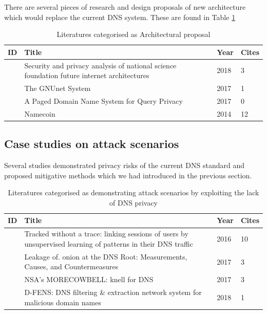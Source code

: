 \documentclass[a4paper,12pt]{article}
\begin{document}
There are several pieces of research and design proposals of new architecture which would replace the current DNS system. These are found in Table \ref{architectures}

\begin{table}[h!]
    \begin{tabular}{ | l | p{10.5cm} | l | l | }
        \hline
            ID & Title & Year & Cites \\ \hline
            \cite{ambrosin2018security} & Security and privacy analysis of national science foundation future internet architectures & 2018 & 3 \\ \hline
            \cite{grothoff2017gnunet} & The GNUnet System & 2017 & 1 \\ \hline
            \cite{asoni2017paged} & A Paged Domain Name System for Query Privacy & 2017 & 0 \\ \hline
            \cite{loibl2014namecoin} & Namecoin & 2014 & 12 \\ \hline
        \end{tabular}
        \caption{Literatures categorised as Architectural proposal}
    \label{architectures}
\end{table}
\FloatBarrier
\subsection{Case studies on attack scenarios}
Several studies demonstrated privacy risks of the current DNS standard and proposed mitigative methods which we had introduced in the previous section. 

\begin{table}[h!]
    \begin{tabular}{ | l | p{10.5cm} | l | l | }
        \hline
            ID & Title & Year & Cites \\ \hline
            \cite{kirchler2016tracked} & Tracked without a trace: linking sessions of users by unsupervised learning of patterns in their DNS traffic & 2016 & 10 \\ \hline
            \cite{mohaisen2017leakage} & Leakage of. onion at the DNS Root: Measurements, Causes, and Countermeasures & 2017 & 3 \\ \hline
            \cite{grothoff2017nsa} & NSA's MORECOWBELL: knell for DNS & 2017 & 3 \\ \hline
            \cite{spaulding2018d} & D-FENS: DNS filtering \& extraction network system for malicious domain names & 2018 & 1 \\ \hline
        \end{tabular}
        \caption{Literatures categorised as demonstrating attack scenarios by exploiting the lack of DNS privacy}
\label{attacks}
\end{table}
\end{document}
